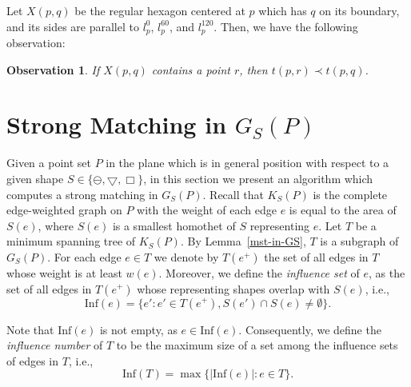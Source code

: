 \documentclass[11pt,a4paper]{article}
\newcommand{\G}[2]{G_{#1}({#2})}
\newcommand{\Inf}[1]{\text{Inf}(#1)}
\newcommand{\ddisc}{\ominus}
\newcommand{\sqr}{\Box}
\newcommand{\trid}{\bigtriangledown}
\newtheorem{observation}{Observation}
\begin{document}
Let $X(p,q)$ be the regular hexagon centered at $p$ which has $q$ on its boundary, and its sides are parallel to $l_p^0$, $l_p^{60}$, and $l_p^{120}$. Then, we have the following observation:
\begin{observation}
\label{obs2}
If $X(p,q)$ contains a point $r$, then $t(p,r)\prec t(p,q)$.
\end{observation}

\section{Strong Matching in $\G{S}{P}$}
\label{algorithm-section}

Given a point set $P$ in the plane which is in general position with respect to a given shape $S\in\{\ddisc, \trid, \sqr\}$, in this section we present an algorithm which computes a strong matching in $\G{S}{P}$. Recall that $K_S(P)$ is the complete edge-weighted graph on $P$ with the weight of each edge $e$ is equal to the area of $S(e)$, where $S(e)$ is a smallest homothet of $S$ representing $e$. Let $T$ be a minimum spanning tree of $K_S(P)$. By Lemma~\ref{mst-in-GS}, $T$ is a subgraph of $\G{S}{P}$. For each edge $e\in T$ we denote by $T(e^+)$ the set of all edges in $T$ whose weight is at least $w(e)$. Moreover, we define the {\em influence set} of $e$, as the set of all edges in $T(e^+)$ whose representing shapes overlap with $S(e)$, i.e.,
$$\Inf{e}=\{e': e'\in T(e^+), S(e')\cap S(e)\neq \emptyset\}.$$

Note that $\Inf{e}$ is not empty, as $e\in \Inf{e}$. Consequently, we define the {\em influence number} of $T$ to be the maximum size of a set among the influence sets of edges in $T$, i.e.,
$$\Inf{T}=\max\{|\Inf{e}|: e\in T\}.$$
\end{document}
